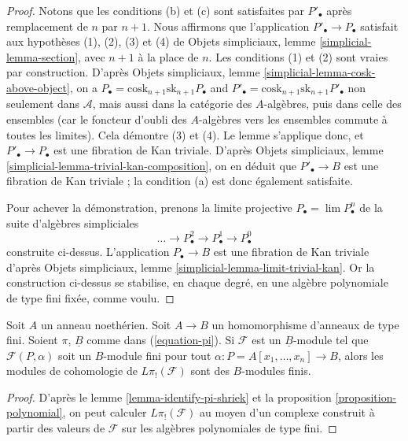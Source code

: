 \begin{proof}
\medskip\noindent
Notons que les conditions (b) et (c) sont satisfaites par $P'_\bullet$ après
remplacement de $n$ par $n + 1$. Nous affirmons que l'application
$P'_\bullet \to P_\bullet$ satisfait aux hypothèses (1), (2), (3) et (4) de
Objets simpliciaux, lemme \ref{simplicial-lemma-section}, avec $n + 1$ à la
place de $n$. Les conditions (1) et (2) sont vraies par construction. D'après
Objets simpliciaux, lemme \ref{simplicial-lemma-cosk-above-object}, on a
$P_\bullet = \text{cosk}_{n + 1}\text{sk}_{n + 1}P_\bullet$
and
$P'_\bullet = \text{cosk}_{n + 1}\text{sk}_{n + 1}P'_\bullet$
non seulement dans $\mathcal{A}$, mais aussi dans la catégorie des
$A$-algèbres, puis dans celle des ensembles (car le foncteur d'oubli des
$A$-algèbres vers les ensembles commute à toutes les limites). Cela démontre
(3) et (4). Le lemme s'applique donc, et
$P'_\bullet \to P_\bullet$ est une fibration de Kan triviale. D'après Objets
simpliciaux, lemme \ref{simplicial-lemma-trivial-kan-composition}, on en déduit
que $P'_\bullet \to B$ est une fibration de Kan triviale ; la condition (a)
est donc également satisfaite.

\medskip\noindent
Pour achever la démonstration, prenons la limite projective
$P_\bullet = \lim P^n_\bullet$ de la suite d'algèbres simpliciales
$$
\ldots \to P^2_\bullet \to P^1_\bullet \to P^0_\bullet
$$
construite ci-dessus. L'application $P_\bullet \to B$ est une fibration de Kan
triviale d'après Objets simpliciaux, lemme
\ref{simplicial-lemma-limit-trivial-kan}. Or la construction ci-dessus se
stabilise, en chaque degré, en une algèbre polynomiale de type fini fixée,
comme voulu.
\end{proof}

\begin{lemma}
\label{lemma-pi-shriek-finite}
Soit $A$ un anneau noethérien. Soit $A \to B$ un homomorphisme d'anneaux de
type fini. Soient $\pi$, $\underline{B}$ comme dans (\ref{equation-pi}).
Si $\mathcal{F}$ est un $\underline{B}$-module tel que
$\mathcal{F}(P, \alpha)$ soit un $B$-module fini pour tout
$\alpha : P = A[x_1, \ldots, x_n] \to B$, alors les modules de cohomologie de
$L\pi_!(\mathcal{F})$ sont des $B$-modules finis.
\end{lemma}

\begin{proof}
D'après le lemme \ref{lemma-identify-pi-shriek} et la proposition
\ref{proposition-polynomial}, on peut calculer $L\pi_!(\mathcal{F})$ au moyen
d'un complexe construit à partir des valeurs de $\mathcal{F}$ sur les algèbres
polynomiales de type fini.
\end{proof}

